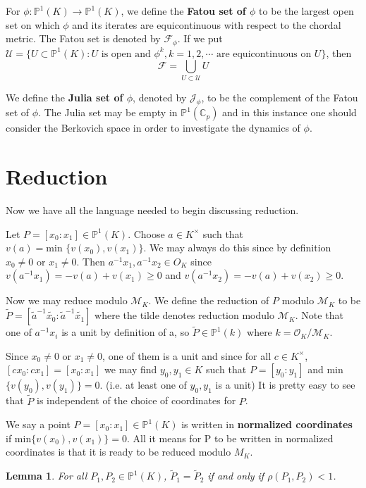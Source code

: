 \documentclass{amsart}
\newtheorem{lem}[thm]{Lemma}
\newcommand{\sbs}{\subset}
\newcommand{\C}{\mathbb{C}}
\renewcommand{\P}{\mathbb{P}}
\newcommand{\MCM}{\mathcal{M}}
\newcommand{\MCF}{\mathcal{F}}
\newcommand{\MCJ}{\mathcal{J}}
\newcommand{\MCO}{\mathcal{O}}
\newcommand{\MCU}{\mathcal{U}}
\begin{document}
For $\phi:\P^1(K) \rightarrow \P^1(K)$, we define the \textbf{Fatou set of $\phi$} to be the largest open set on which $\phi$ and its iterates are equicontinuous with respect to the chordal metric. The Fatou set is denoted by $\MCF_{\phi}$. If we put \\$\MCU = \{U \sbs \P^1(K): U \text{ is open and }\phi^k, k=1,2,\cdots \text{ are equicontinuous on } U \}$, then 
$$\MCF = \bigcup_{U \sbs \MCU} U$$

We define the \textbf{Julia set of $\phi$}, denoted by $\MCJ_{\phi}$, to be the complement of the Fatou set of $\phi$. The Julia set may be empty in $\P^1(\C_p)$ and in this instance one should consider the Berkovich space in order to investigate the dynamics of $\phi$.
 
\section{Reduction}


Now we have all the language needed to begin discussing reduction.  

Let $P=[x_0:x_1] \in \mathbb{P}^{1}(K)$.  Choose $a \in K^{\times}$ such that $v(a)=\text{min } \{v(x_0),v(x_1)\}$.  We may always do this since by definition $x_0 \neq 0$ or $x_1 \neq 0$.  Then $a^{-1}x_1, a^{-1}x_2 \in O_K$ since $v(a^{-1}x_1)=-v(a)+v(x_1) \geq 0$ and $v(a^{-1}x_2)=-v(a)+v(x_2) \geq 0$.

Now we may reduce modulo $\MCM_K$.  We define the reduction of $P$ modulo $\MCM_K$ to be $\tilde{P}=[\tilde{a}^{-1}\tilde{x_0}: \tilde{a}^{-1}\tilde{x_1}]$ where the tilde denotes reduction modulo $\MCM_K$.  Note that one of $a^{-1}x_i$ is a unit by definition of a, so $\tilde{P} \in \mathbb{P}^1(k)$ where $k = \MCO_K/\MCM_K$. 

Since $x_0 \neq 0$ or $x_1 \neq 0$, one of them is a unit and since for all $c \in K^{\times}$, $[cx_0:cx_1]=[x_0:x_1]$ we may find $y_0,y_1 \in K$ such that $P=[y_0:y_1]$ and min$\{v(y_0),v(y_1)\}=0$.  (i.e. at least one of $y_0,y_1$ is a unit)
It is pretty easy to see that $\tilde{P}$ is independent of the choice of coordinates for $P$.

We say a point $P=[x_0:x_1] \in \mathbb{P}^1(K)$ is written in \textbf{normalized coordinates} if min$\{v(x_0),v(x_1)\}=0$. All it means for P to be written in normalized coordinates is that it is ready to be reduced modulo $M_K$.  

\begin{lem}
For all $P_1,P_2 \in \mathbb{P}^1(K)$, $\tilde{P}_1=\tilde{P}_2$ if and only if $\rho(P_1,P_2)<1$. 
\end{lem}
\end{document}
